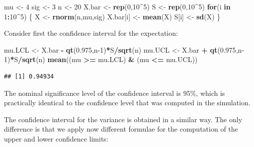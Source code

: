 \documentclass[
]{krantz}
\makeatletter
\newenvironment{Shaded}{\begin{snugshade}}{\end{snugshade}}
\newcommand{\ControlFlowTok}[1]{\textcolor[rgb]{0.13,0.29,0.53}{\textbf{#1}}}
\newcommand{\DecValTok}[1]{\textcolor[rgb]{0.00,0.00,0.81}{#1}}
\newcommand{\FloatTok}[1]{\textcolor[rgb]{0.00,0.00,0.81}{#1}}
\newcommand{\KeywordTok}[1]{\textcolor[rgb]{0.13,0.29,0.53}{\textbf{#1}}}
\newcommand{\NormalTok}[1]{#1}
\newcommand{\OperatorTok}[1]{\textcolor[rgb]{0.81,0.36,0.00}{\textbf{#1}}}
\newcommand{\StringTok}[1]{\textcolor[rgb]{0.31,0.60,0.02}{#1}}
\newenvironment{kframe}{%
\medskip{}
\setlength{\fboxsep}{.8em}
 \def\at@end@of@kframe{}%
 \ifinner\ifhmode%
  \def\at@end@of@kframe{\end{minipage}}%
  \begin{minipage}{\columnwidth}%
 \fi\fi%
 \def\FrameCommand##1{\hskip\@totalleftmargin \hskip-\fboxsep
 \colorbox{shadecolor}{##1}\hskip-\fboxsep
     \hskip-\linewidth \hskip-\@totalleftmargin \hskip\columnwidth}%
 \MakeFramed {\advance\hsize-\width
   \@totalleftmargin\z@ \linewidth\hsize
   \@setminipage}}%
 {\par\unskip\endMakeFramed%
 \at@end@of@kframe}
\renewenvironment{Shaded}{\begin{kframe}}{\end{kframe}}
\theoremstyle{definition}
\theoremstyle{definition}
\theoremstyle{definition}
\theoremstyle{remark}
\makeatother
\begin{document}
\begin{Shaded}
\begin{Highlighting}[]
\NormalTok{mu <-}\StringTok{ }\DecValTok{4}
\NormalTok{sig <-}\StringTok{ }\DecValTok{3}
\NormalTok{n <-}\StringTok{ }\DecValTok{20}
\NormalTok{X.bar <-}\StringTok{ }\KeywordTok{rep}\NormalTok{(}\DecValTok{0}\NormalTok{,}\DecValTok{10}\OperatorTok{^}\DecValTok{5}\NormalTok{)}
\NormalTok{S <-}\StringTok{ }\KeywordTok{rep}\NormalTok{(}\DecValTok{0}\NormalTok{,}\DecValTok{10}\OperatorTok{^}\DecValTok{5}\NormalTok{)}
\ControlFlowTok{for}\NormalTok{(i }\ControlFlowTok{in} \DecValTok{1}\OperatorTok{:}\DecValTok{10}\OperatorTok{^}\DecValTok{5}\NormalTok{) \{}
\NormalTok{  X <-}\StringTok{ }\KeywordTok{rnorm}\NormalTok{(n,mu,sig)}
\NormalTok{  X.bar[i] <-}\StringTok{ }\KeywordTok{mean}\NormalTok{(X)}
\NormalTok{  S[i] <-}\StringTok{ }\KeywordTok{sd}\NormalTok{(X)}
\NormalTok{\}}
\end{Highlighting}
\end{Shaded}

Consider first the confidence interval for the expectation:

\begin{Shaded}
\begin{Highlighting}[]
\NormalTok{mu.LCL <-}\StringTok{ }\NormalTok{X.bar }\OperatorTok{-}\StringTok{ }\KeywordTok{qt}\NormalTok{(}\FloatTok{0.975}\NormalTok{,n}\DecValTok{-1}\NormalTok{)}\OperatorTok{*}\NormalTok{S}\OperatorTok{/}\KeywordTok{sqrt}\NormalTok{(n)}
\NormalTok{mu.UCL <-}\StringTok{ }\NormalTok{X.bar }\OperatorTok{+}\StringTok{ }\KeywordTok{qt}\NormalTok{(}\FloatTok{0.975}\NormalTok{,n}\DecValTok{-1}\NormalTok{)}\OperatorTok{*}\NormalTok{S}\OperatorTok{/}\KeywordTok{sqrt}\NormalTok{(n)}
\KeywordTok{mean}\NormalTok{((mu }\OperatorTok{>=}\StringTok{ }\NormalTok{mu.LCL) }\OperatorTok{&}\StringTok{ }\NormalTok{(mu }\OperatorTok{<=}\StringTok{ }\NormalTok{mu.UCL))}
\end{Highlighting}
\end{Shaded}

\begin{verbatim}
## [1] 0.94934
\end{verbatim}

The nominal significance level of the confidence interval is 95\%, which
is practically identical to the confidence level that was computed in
the simulation.

The confidence interval for the variance is obtained in a similar way.
The only difference is that we apply now different formulae for the
computation of the upper and lower confidence limits:
\end{document}

